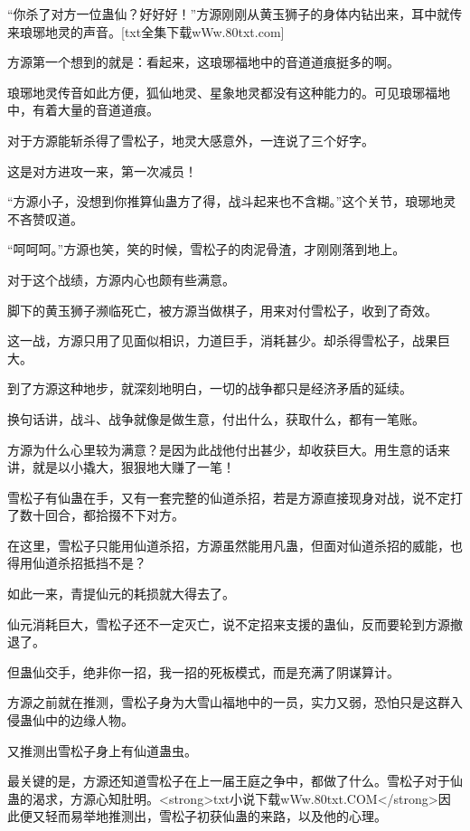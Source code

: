 
\begin{this_body}

“你杀了对方一位蛊仙？好好好！”方源刚刚从黄玉狮子的身体内钻出来，耳中就传来琅琊地灵的声音。[txt全集下载wWw.80txt.com]

方源第一个想到的就是：看起来，这琅琊福地中的音道道痕挺多的啊。

琅琊地灵传音如此方便，狐仙地灵、星象地灵都没有这种能力的。可见琅琊福地中，有着大量的音道道痕。

对于方源能斩杀得了雪松子，地灵大感意外，一连说了三个好字。

这是对方进攻一来，第一次减员！

“方源小子，没想到你推算仙蛊方了得，战斗起来也不含糊。”这个关节，琅琊地灵不吝赞叹道。

“呵呵呵。”方源也笑，笑的时候，雪松子的肉泥骨渣，才刚刚落到地上。

对于这个战绩，方源内心也颇有些满意。

脚下的黄玉狮子濒临死亡，被方源当做棋子，用来对付雪松子，收到了奇效。

这一战，方源只用了见面似相识，力道巨手，消耗甚少。却杀得雪松子，战果巨大。

到了方源这种地步，就深刻地明白，一切的战争都只是经济矛盾的延续。

换句话讲，战斗、战争就像是做生意，付出什么，获取什么，都有一笔账。

方源为什么心里较为满意？是因为此战他付出甚少，却收获巨大。用生意的话来讲，就是以小撬大，狠狠地大赚了一笔！

雪松子有仙蛊在手，又有一套完整的仙道杀招，若是方源直接现身对战，说不定打了数十回合，都拾掇不下对方。

在这里，雪松子只能用仙道杀招，方源虽然能用凡蛊，但面对仙道杀招的威能，也得用仙道杀招抵挡不是？

如此一来，青提仙元的耗损就大得去了。

仙元消耗巨大，雪松子还不一定灭亡，说不定招来支援的蛊仙，反而要轮到方源撤退了。

但蛊仙交手，绝非你一招，我一招的死板模式，而是充满了阴谋算计。

方源之前就在推测，雪松子身为大雪山福地中的一员，实力又弱，恐怕只是这群入侵蛊仙中的边缘人物。

又推测出雪松子身上有仙道蛊虫。

最关键的是，方源还知道雪松子在上一届王庭之争中，都做了什么。雪松子对于仙蛊的渴求，方源心知肚明。<strong>txt小说下载wWw.80txt.COM</strong>因此便又轻而易举地推测出，雪松子初获仙蛊的来路，以及他的心理。


\end{this_body}
